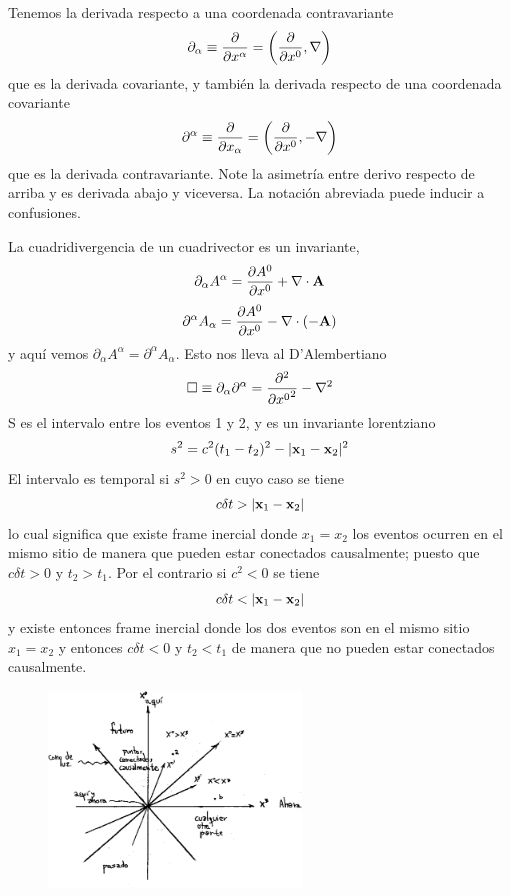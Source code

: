 \documentclass[10pt,oneside]{CBFT_book}
\begin{document}
Tenemos la derivada respecto a una coordenada contravariante
\[
	\partial_\alpha \equiv \dpar{}{x^\alpha} = \left( \dpar{}{x^0}, \Nabla \right)
\]
que es la derivada covariante, y también la derivada respecto de una coordenada covariante
\[
	\partial^\alpha \equiv \dpar{}{x_\alpha} = \left( \dpar{}{x^0}, - \Nabla \right)
\]
que es la derivada contravariante. Note la asimetría entre derivo respecto de arriba y es derivada abajo
y viceversa. La notación abreviada puede inducir a confusiones.

La cuadridivergencia de un cuadrivector es un invariante,
\[
	\partial_\alpha A^\alpha = \dpar{A^0}{x^0} + \Nabla\cdot\vb{A}
\]
\[
	\partial^\alpha A_\alpha = \dpar{A^0}{x^0} - \Nabla\cdot(-\vb{A})
\]
y aquí vemos $\partial_\alpha A^\alpha = \partial^\alpha A_\alpha$. Esto nos lleva al D'Alembertiano
\[
	\Box \equiv \partial_\alpha \partial^\alpha = \dpar[2]{}{x^0} - \nabla^2
\]
S es el intervalo entre los eventos 1 y 2, y es un invariante lorentziano
\[
	s^2 = c^2( t_1 - t_2 )^2 - | \vb{x}_1 - \vb{x}_2 |^2
\]
El intervalo es temporal si $s^2 >0$ en cuyo caso se tiene 
\[
	c \delta t >  | \vb{x}_1 - \vb{x}_2 |
\]
lo cual significa que existe frame inercial donde $x_1=x_2$ los eventos ocurren en el mismo sitio de manera
que pueden estar conectados causalmente; puesto que $c\delta t > 0$ y $t_2>t_1$. Por el contrario si 
$c^2 < 0$ se tiene 
\[
	c \delta t <  | \vb{x}_1 - \vb{x}_2 |
\]
y existe entonces frame inercial donde los dos eventos son en el mismo sitio $x_1=x_2$ y entonces $c\delta t 
< 0$ y $t_2 < t_1$ de manera que no pueden estar conectados causalmente.

\begin{figure}[htb]
	\begin{center}
	\includegraphics[width=0.6\textwidth]{images/fig_ft1_intervalos.pdf}	 
	\end{center}
	\caption{}
\end{figure} 
\end{document}
